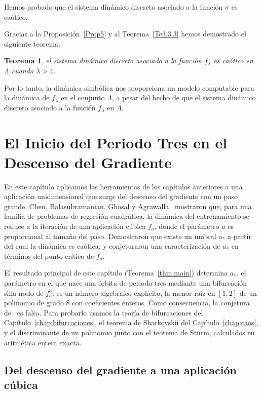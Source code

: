 \documentclass[12pt,a4paper]{report}
\newtheorem{teorema}{Teorema}[section]
\theoremstyle{definition}
\begin{document}
Hemos probado que el sistema dinámico discreto asociado a la función $\sigma$ es caótico.

Gracias a la Proposición~\ref{Prop5} y al Teorema~\ref{Te3.3.3} hemos demostrado el siguiente teorema:

\begin{teorema}
el sistema dinámico discreto asociado a la función $f_{\lambda}$ es caótico en $\Lambda$ cuando $\lambda > 4$.
\end{teorema}

Por lo tanto, la dinámica simbólica nos proporciona un modelo computable para la dinámica de $f_{\lambda}$ en el conjunto $\Lambda$, a pesar del hecho de que el sistema dinámico discreto asociado a la función $f_{\lambda}$ en $\Lambda$.


\chapter{El Inicio del Periodo Tres en el Descenso del Gradiente}\label{chap:gd}

En este capítulo aplicamos las herramientas de los capítulos anteriores a una aplicación unidimensional que surge del descenso del gradiente con un paso grande. Chen, Balasubramanian, Ghosal y Agrawalla~\cite{chen2024} mostraron que, para una familia de problemas de regresión cuadrática, la dinámica del entrenamiento se reduce a la iteración de una aplicación cúbica $f_a$, donde el parámetro $a$ es proporcional al tamaño del paso. Demostraron que existe un umbral $a_*$ a partir del cual la dinámica es caótica, y conjeturaron una caracterización de $a_*$ en términos del punto crítico de $f_a$.

El resultado principal de este capítulo (Teorema~\ref{thm:main}) determina $a_*$, el parámetro en el que nace una órbita de periodo tres mediante una bifurcación silla-nodo de $f_a^3$: es un número algebraico explícito, la menor raíz en $[1,2]$ de un polinomio de grado $8$ con coeficientes enteros. Como consecuencia, la conjetura de~\cite{chen2024} es falsa. Para probarlo usamos la teoría de bifurcaciones del Capítulo~\ref{chap:bifurcaciones}, el teorema de Sharkovskii del Capítulo~\ref{chap:caos}, y el discriminante de un polinomio junto con el teorema de Sturm, calculados en aritmética entera exacta.

\section{Del descenso del gradiente a una aplicación cúbica}
\end{document}
